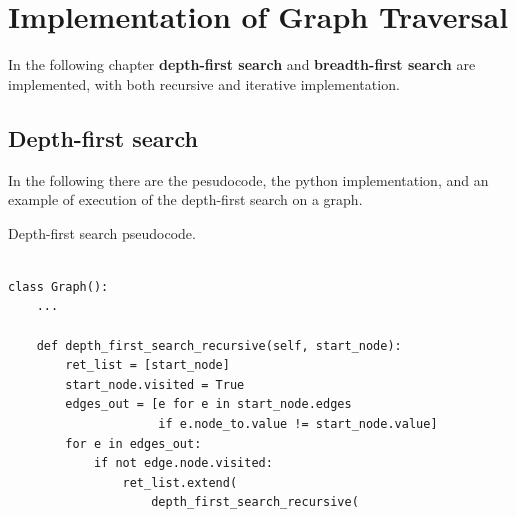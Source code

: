 \chapter{Implementation of Graph Traversal}
\label{graphimplementationtraversalappendix}
In the following chapter \textbf{depth-first search} and \textbf{breadth-first search} are implemented, with both recursive and iterative implementation.
\section{Depth-first search}
In the following there are the pesudocode, the python implementation, and an example of execution of the depth-first search on a graph.

\begin{algorithm}[H]
	\DontPrintSemicolon
	\LinesNumbered
  	\;
\caption{Depth-first search pseudocode.}
\end{algorithm}

\begin{lstlisting}[firstnumber=1, caption={Recursive and iterative implementation of depth-first search on graphs.}]
		
class Graph():
	...
	
	def depth_first_search_recursive(self, start_node):
		ret_list = [start_node]
		start_node.visited = True
		edges_out = [e for e in start_node.edges
					 if e.node_to.value != start_node.value]
		for e in edges_out:
			if not edge.node.visited:
				ret_list.extend(
					depth_first_search_recursive(
						
	
\end{lstlisting}

